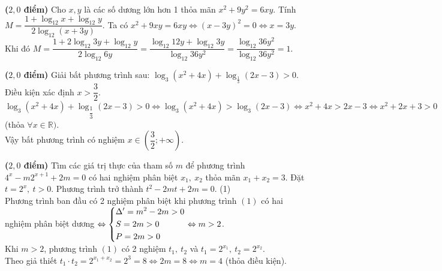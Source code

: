 \begin{bt}\textbf{($2,0$ điểm)}%
	Cho $x,y$ là các số dương lớn hơn 1 thỏa mãn $x^2+9y^2=6xy$. Tính \break $M=\dfrac{1+\log_{12} x+ \log_{12} y}{2 \log_{12} (x+3y)}$.
	\loigiai
	{
		Ta có $x^2+9xy=6xy \Leftrightarrow (x-3y)^2=0 \Leftrightarrow x=3y$.\\
		Khi đó $M=\dfrac{1+2\log_{12} 3y + \log_{12} y}{2\log_{12} 6y} =\dfrac{\log_{12} 12y+ \log_{12} 3y}{\log_{12} 36y^2} =\dfrac{\log_{12} 36y^2}{\log_{12} 36y^2}=1$.
	}
\end{bt}

\begin{bt}\textbf{($2,0$ điểm)}%
	Giải bất phương trình sau: $\log_{3}(x^{2}+4x)+\log_{\frac{1}{3}}(2x-3)>0$.
	\loigiai
	{
		Điều kiện xác định $x>\dfrac{3}{2}$.\\
		$\log_{3}(x^{2}+4x)+\log_{\dfrac{1}{3}}(2x-3)>0\Leftrightarrow \log_{3}(x^{2}+4x)>\log_{3}(2x-3)\Leftrightarrow x^{2}+4x>2x-3\Leftrightarrow x^{2}+2x+3>0$ (thỏa $\forall x \in \mathbb{R})$.\\
		Vậy bất phương trình có nghiệm $x \in \left(\dfrac{3}{2};+\infty \right)$.
	}
\end{bt}

\begin{bt}\textbf{($2,0$ điểm)}%
	Tìm các giá trị thực  của tham số $m$ để phương trình $4^x-m2^{x+1}+2m=0$ có hai nghiệm phân biệt $x_1,\ x_2$ thỏa mãn $x_1+x_2=3$.
	\loigiai
	{
		Đặt $t=2^x,\ t>0$. Phương trình trở thành $t^2-2mt+2m=0$. \hfill (1)\\
		Phương trình ban đầu có 2 nghiệm phân biệt khi phương trình $(1)$ có hai nghiệm phân biệt dương $\Leftrightarrow \left\{\begin{aligned}&\Delta'=m^2-2m>0\\ &S=2m>0\\&P=2m>0\end{aligned}\right. \Leftrightarrow m>2$.\\
		Khi $m>2$, phương trình $(1)$ có 2 nghiệm $t_1,\ t_2$ và $t_1=2^{x_1},\ t_2=2^{x_2}$.\\
		Theo giả thiết $t_1\cdot t_2=2^{x_1+x_2}=2^3=8 \Leftrightarrow 2m=8 \Leftrightarrow m=4$ (thỏa điều kiện).	
	}
\end{bt}

